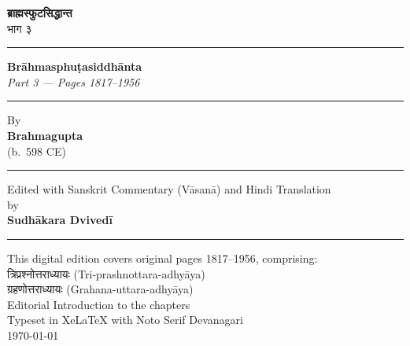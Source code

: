 \documentclass[11pt,a4paper]{article}
\newcommand{\shortline}{\noindent\rule{0.5\textwidth}{0.4pt}\par}
\begin{document}
\thispagestyle{empty}
\begin{center}
\vspace*{2cm}

{\Huge\color{titlecolor}\devanagarifont\bfseries ब्राह्मस्फुटसिद्धान्त}\\[0.8cm]
{\LARGE\color{sectioncolor}\devanagarifont भाग ३}\\[1.5cm]

\shortline

{\Large\bfseries Brāhmasphuṭasiddhānta}\\[0.3cm]
{\large\itshape Part 3 --- Pages 1817--1956}\\[1cm]

\shortline

{\large By}\\[0.3cm]
{\LARGE\bfseries Brahmagupta}\\[0.5cm]
{\large (b.~598 CE)}\\[1.5cm]

\shortline

{\large Edited with Sanskrit Commentary (Vāsanā) and Hindi Translation}\\[0.3cm]
{\large by}\\[0.3cm]
{\large\bfseries Sudhākara Dvivedī}\\[1cm]

\shortline

{\small This digital edition covers original pages 1817--1956, comprising:}\\[0.2cm]
{\small\devanagarifont त्रिप्रश्नोत्तराध्यायः (Tri-prashnottara-adhyāya)}\\[0.1cm]
{\small\devanagarifont ग्रहणोत्तराध्यायः (Grahana-uttara-adhyāya)}\\[0.1cm]
{\small Editorial Introduction to the chapters}\\[2cm]

\vfill
{\small Typeset in XeLaTeX with Noto Serif Devanagari}\\
{\small \today}
\end{center}
\newpage

\tableofcontents
\newpage

\end{document}
